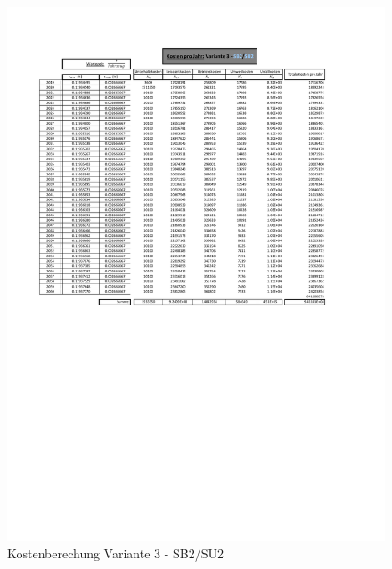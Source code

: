 \begin{figure}[h!]
	\centering
	\includegraphics[width=\textwidth]{figures/Anhang/f-00-A-V3-B2-U2}
	\caption{Kostenberechung Variante 3 - SB2/SU2}
\end{figure}

